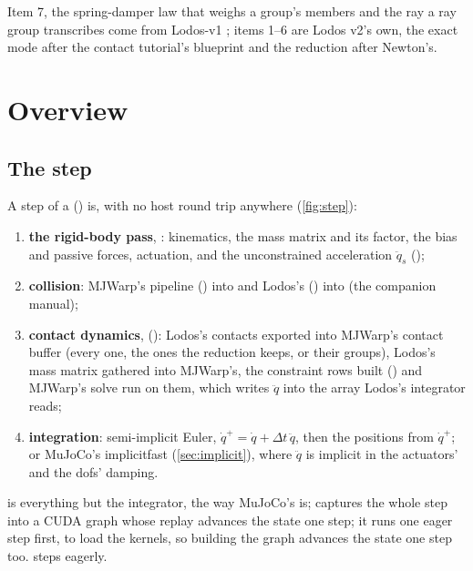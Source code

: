 Item 7, the spring-damper law that weighs a group's members and the ray a ray group transcribes come from Lodos-v1 \cite{lodosv1}; items 1--6 are Lodos v2's own, the exact mode after the contact tutorial's blueprint and the reduction after Newton's.

\section{Overview}\label{sec:overview}

\subsection{The step}\label{sec:step}

A step of a  () is, with no host round trip anywhere (\cref{fig:step}):

\begin{enumerate}
\item \textbf{the rigid-body pass}, : kinematics, the mass matrix and its factor, the bias and passive forces, actuation, and the unconstrained acceleration $\ddot q_s$ ();
\item \textbf{collision}: MJWarp's pipeline () into  and Lodos's () into  (the companion manual);
\item \textbf{contact dynamics},  (): Lodos's contacts exported into MJWarp's contact buffer (every one, the ones the reduction keeps, or their groups), Lodos's mass matrix gathered into MJWarp's, the constraint rows built () and MJWarp's solve run on them, which writes $\ddot q$ into the array Lodos's integrator reads;
\item \textbf{integration}: semi-implicit Euler, $\dot q^+ = \dot q + \Delta t\,\ddot q$, then the positions from $\dot q^+$; or MuJoCo's implicitfast (\cref{sec:implicit}), where $\ddot q$ is implicit in the actuators' and the dofs' damping.
\end{enumerate}

 is everything but the integrator, the way MuJoCo's  is;  captures the whole step into a CUDA graph whose replay advances the state one step; it runs one eager step first, to load the kernels, so building the graph advances the state one step too.  steps eagerly.

